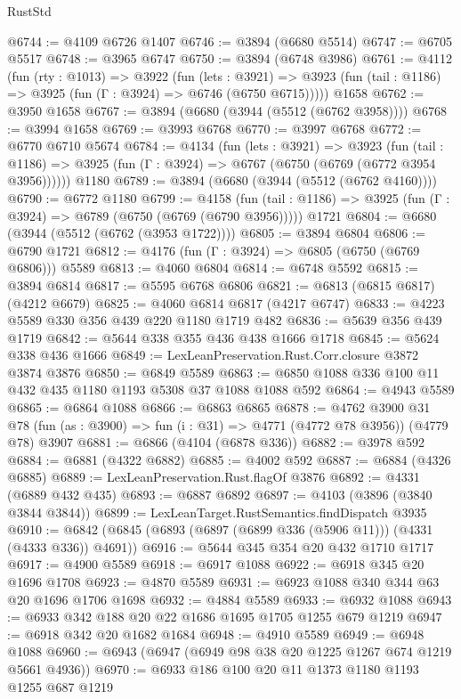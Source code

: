 \begin{lexlean}{RustStd}
\begin{coremodule}
{\begin{coremodule}
{{{{{{{{{{{{{{{{{{{{{{{{{{{{{{{{@6744 := @4109 @6726 @1407
@6746 := @3894 (@6680 @5514)
@6747 := @6705 @5517
@6748 := @3965 @6747
@6750 := @3894 (@6748 @3986)
@6761 := @4112
    (fun (rty : @1013) =>
    @3922
      (fun (lets : @3921) =>
      @3923 (fun (tail : @1186) => @3925 (fun (Γ : @3924) => @6746 (@6750 @6715)))))
    @1658
@6762 := @3950 @1658
@6767 := @3894 (@6680 (@3944 (@5512 (@6762 @3958))))
@6768 := @3994 @1658
@6769 := @3993 @6768
@6770 := @3997 @6768
@6772 := @6770 @6710 @5674
@6784 := @4134
    (fun (lets : @3921) =>
    @3923
      (fun (tail : @1186) => @3925 (fun (Γ : @3924) => @6767 (@6750 (@6769 (@6772 @3954 @3956))))))
    @1180
@6789 := @3894 (@6680 (@3944 (@5512 (@6762 @4160))))
@6790 := @6772 @1180
@6799 := @4158
    (fun (tail : @1186) => @3925 (fun (Γ : @3924) => @6789 (@6750 (@6769 (@6790 @3956)))))
    @1721
@6804 := @6680 (@3944 (@5512 (@6762 (@3953 @1722))))
@6805 := @3894 @6804
@6806 := @6790 @1721
@6812 := @4176 (fun (Γ : @3924) => @6805 (@6750 (@6769 @6806))) @5589
@6813 := @4060 @6804
@6814 := @6748 @5592
@6815 := @3894 @6814
@6817 := @5595 @6768 @6806
@6821 := @6813 (@6815 @6817) (@4212 @6679)
@6825 := @4060 @6814 @6817 (@4217 @6747)
@6833 := @4223 @5589 @330 @356 @439 @220 @1180 @1719 @482
@6836 := @5639 @356 @439 @1719
@6842 := @5644 @338 @355 @436 @438 @1666 @1718
@6845 := @5624 @338 @436 @1666
@6849 := LexLeanPreservation.Rust.Corr.closure @3872 @3874 @3876
@6850 := @6849 @5589
@6863 := @6850 @1088 @336 @100 @11 @432 @435 @1180 @1193 @5308 @37 @1088 @1088 @592
@6864 := @4943 @5589
@6865 := @6864 @1088
@6866 := @6863 @6865
@6878 := @4762
    @3900
    @31
    @78
    (fun (as : @3900) => fun (i : @31) => @4771 (@4772 @78 @3956))
    (@4779 @78)
    @3907
@6881 := @6866 (@4104 (@6878 @336))
@6882 := @3978 @592
@6884 := @6881 (@4322 @6882)
@6885 := @4002 @592
@6887 := @6884 (@4326 @6885)
@6889 := LexLeanPreservation.Rust.flagOf @3876
@6892 := @4331 (@6889 @432 @435)
@6893 := @6887 @6892
@6897 := @4103 (@3896 (@3840 @3844 @3844))
@6899 := LexLeanTarget.RustSemantics.findDispatch @3935
@6910 := @6842 (@6845 (@6893 (@6897 (@6899 @336 (@5906 @11))) (@4331 (@4333 @336)) @4691))
@6916 := @5644 @345 @354 @20 @432 @1710 @1717
@6917 := @4900 @5589
@6918 := @6917 @1088
@6922 := @6918 @345 @20 @1696 @1708
@6923 := @4870 @5589
@6931 := @6923 @1088 @340 @344 @63 @20 @1696 @1706 @1698
@6932 := @4884 @5589
@6933 := @6932 @1088
@6943 := @6933 @342 @188 @20 @22 @1686 @1695 @1705 @1255 @679 @1219
@6947 := @6918 @342 @20 @1682 @1684
@6948 := @4910 @5589
@6949 := @6948 @1088
@6960 := @6943 (@6947 (@6949 @98 @38 @20 @1225 @1267 @674 @1219 @5661 @4936))
@6970 := @6933 @186 @100 @20 @11 @1373 @1180 @1193 @1255 @687 @1219
}}}}}}}}}}}}}}}}}}}}}}}}}}}}}}}}
\end{coremodule}}
\end{coremodule}
\end{lexlean}
